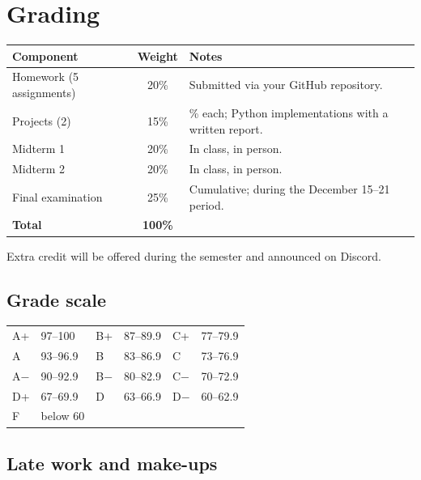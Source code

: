 \documentclass[11pt]{article}
\begin{document}
\section{Grading}

\begin{center}
\renewcommand{\arraystretch}{1.3}
\begin{tabular}{@{} l c >{\raggedright\arraybackslash}p{7.6cm} @{}}
\toprule
\textbf{Component} & \textbf{Weight} & \textbf{Notes} \\
\midrule
Homework (5 assignments) & 20\% & Submitted via your GitHub repository. \\
Projects (2)             & 15\% & 7.5\% each; Python implementations with a written report. \\
Midterm 1                & 20\% & In class, in person. \\
Midterm 2                & 20\% & In class, in person. \\
Final examination        & 25\% & Cumulative; during the December 15--21 period. \\
\midrule
\textbf{Total}           & \textbf{100\%} & \\
\bottomrule
\end{tabular}
\end{center}

Extra credit will be offered during the semester and announced on Discord.

\subsection{Grade scale}

\begin{center}
\renewcommand{\arraystretch}{1.2}
\begin{tabular}{@{} l l l l l l @{}}
\toprule
A+ & 97--100 & B+ & 87--89.9 & C+ & 77--79.9 \\
A  & 93--96.9 & B  & 83--86.9 & C  & 73--76.9 \\
A$-$ & 90--92.9 & B$-$ & 80--82.9 & C$-$ & 70--72.9 \\
D+ & 67--69.9 & D & 63--66.9 & D$-$ & 60--62.9 \\
F  & below 60 & & & & \\
\bottomrule
\end{tabular}
\end{center}

\subsection{Late work and make-ups}
\end{document}
